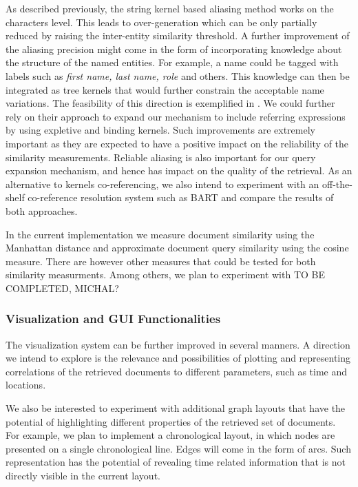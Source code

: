 As described previously, the string kernel based aliasing method works on the characters level. 
This leads to over-generation which can be only partially reduced by raising the inter-entity similarity threshold. 
A further improvement of the aliasing precision might come in the form of incorporating knowledge about the structure of the named entities. 
For example, a name could be tagged
with labels such as \emph{first name, last name, role} and others. This knowledge can then be integrated as tree kernels
that would further constrain the acceptable name variations. The feasibility of this direction is exemplified in \cite{string_kernel_coref}.
We could further rely on their approach to expand our mechanism to include referring expressions by using expletive and binding kernels.
Such improvements are extremely important as they are expected to have a positive impact on the reliability of the similarity measurements. 
Reliable aliasing is also important for our query expansion mechanism, and hence has impact on the quality of the retrieval.
As an alternative to kernels co-referencing, we also intend to experiment with an off-the-shelf co-reference resolution system such as 
BART and compare the results of both approaches. 

In the current implementation we measure document similarity using the Manhattan distance and approximate document query similarity 
using the cosine measure. 
There are however other measures that could be tested for both similarity measurments. 
Among others, we plan to experiment with TO BE COMPLETED, MICHAL?


\subsubsection{Visualization and GUI Functionalities}
The visualization system can be further improved in several manners. 
A direction we intend to explore is the relevance and possibilities of plotting and representing correlations of 
the retrieved documents to different parameters, such as time and locations.

We also be interested to experiment with additional graph layouts that have the potential of highlighting different properties of the 
retrieved set of documents. For example, we plan to implement a chronological layout, in which nodes are presented on a single chronological 
line. Edges will come in the form of arcs. Such representation has the potential of revealing time related information that is not 
directly visible in the current layout. 

